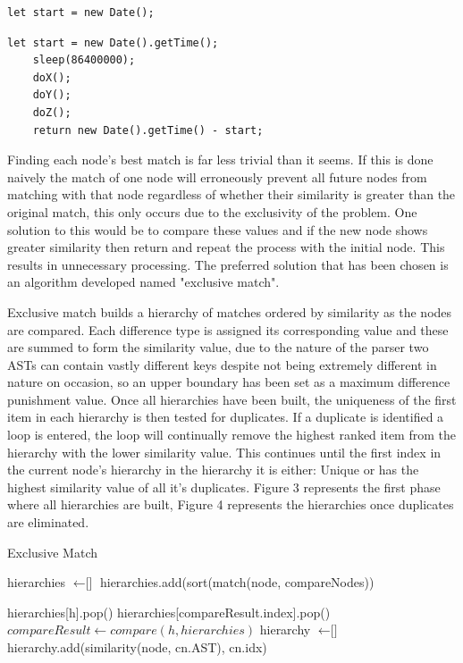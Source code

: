 \documentclass[jou,apacite]{apa6}
\begin{document}
\begin{lstlisting}[caption=Shares one node only - A]
let start = new Date();
\end{lstlisting}

\begin{lstlisting}[caption=Shares one node only - B]
    let start = new Date().getTime();
    sleep(86400000);
    doX();
    doY();
    doZ();
    return new Date().getTime() - start;
\end{lstlisting}

Finding each node’s best match is far less trivial than it seems. If this is done naively the match of one node will erroneously prevent all future nodes from matching with that node regardless of whether their similarity is greater than the original match, this only occurs due to the exclusivity of the problem. One solution to this would be to compare these values and if the new node shows greater similarity then return and repeat the process with the initial node. This results in unnecessary processing. The preferred solution that has been chosen is an algorithm developed named "exclusive match".

Exclusive match builds a hierarchy of matches ordered by similarity as the nodes are compared. Each difference type is assigned its corresponding value and these are summed to form the similarity value, due to the nature of the parser two ASTs can contain vastly different keys despite not being extremely different in nature on occasion, so an upper boundary has been set as a maximum difference punishment value. Once all hierarchies have been built, the uniqueness of the first item in each hierarchy is then tested for duplicates. If a duplicate is identified a loop is entered, the loop will continually remove the highest ranked item from the hierarchy with the lower similarity value. This continues until the first index in the current node's hierarchy in the hierarchy it is either: Unique or has the highest similarity value of all it's duplicates. Figure 3 represents the first phase where all hierarchies are built, Figure 4 represents the hierarchies once duplicates are eliminated.


\begin{algorithm}
\caption{Exclusive Match}\label{euclid}
\begin{algorithmic}[1]
\State hierarchies $\gets \textit{[]}$
	\State hierarchies.add(sort(match(node, compareNodes))
\EndFor

		\State hierarchies[h].pop()
		 \State hierarchies[compareResult.index].pop()
		\EndIf
		\State $compareResult \gets compare(h, hierarchies)$
	\EndWhile
\EndFor
{}
\State hierarchy $\gets \textit{[]}$
	\State hierarchy.add(similarity(node, cn.AST), cn.idx)
	
\EndFor
\EndProcedure

\end{algorithmic}
\end{algorithm}
\end{document}
